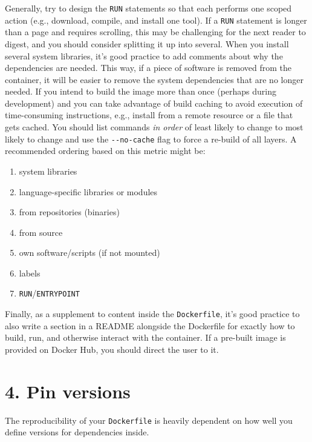 \documentclass[10pt,letterpaper]{article}
\providecommand{\tightlist}{%
  \setlength{\itemsep}{0pt}\setlength{\parskip}{0pt}}
\begin{document}
Generally, try to design the \texttt{RUN} statements so that each
performs one scoped action (e.g., download, compile, and install one
tool). If a \texttt{RUN} statement is longer than a page and requires
scrolling, this may be challenging for the next reader to digest, and
you should consider splitting it up into several. When you install
several system libraries, it's good practice to add comments about why
the dependencies are needed. This way, if a piece of software is removed
from the container, it will be easier to remove the system dependencies
that are no longer needed. If you intend to build the image more than
once (perhaps during development) and you can take advantage of build
caching to avoid execution of time-consuming instructions, e.g., install
from a remote resource or a file that gets cached. You should list
commands \emph{in order} of least likely to change to most likely to
change and use the \texttt{-\/-no-cache} flag to force a re-build of all
layers. A recommended ordering based on this metric might be:

\begin{enumerate}
\def\labelenumi{\arabic{enumi}.}
\tightlist
\item
  system libraries
\item
  language-specific libraries or modules
\item
  from repositories (binaries)
\item
  from source
\item
  own software/scripts (if not mounted)
\item
  labels
\item
  \texttt{RUN}/\texttt{ENTRYPOINT}
\end{enumerate}

Finally, as a supplement to content inside the \texttt{Dockerfile}, it's
good practice to also write a section in a README alongside the
Dockerfile for exactly how to build, run, and otherwise interact with
the container. If a pre-built image is provided on Docker Hub, you
should direct the user to it.

\hypertarget{pin-versions}{%
\section*{4. Pin versions}\label{pin-versions}}

The reproducibility of your \texttt{Dockerfile} is heavily dependent on
how well you define versions for dependencies inside.
\end{document}
